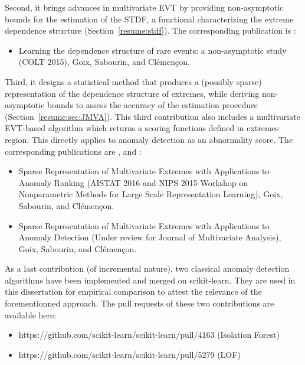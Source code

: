 
Second, it brings advances in multivariate EVT by providing non-asymptotic bounds for the estimation of the STDF, a functional characterizing the extreme dependence structure (Section~\ref{resume:stdf}). The corresponding publication is \cite{COLT15}:
\begin{itemize}
\item Learning the dependence structure of rare events: a non-asymptotic study (COLT 2015), Goix, Sabourin, and Clémençon.
\end{itemize}
Third, it designs a statistical method that produces a (possibly sparse) representation of the dependence structure of extremes, while deriving non-asymptotic bounds to assess the accuracy of the estimation procedure (Section~\ref{resume:sec:JMVA}).
%
This third contribution also includes a multivariate EVT-based algorithm which returns a scoring functions defined in extremes region. This directly applies to anomaly detection as an abnormality score.
The corresponding publications are \cite{AISTAT16}, \cite{NIPSWORKSHOP15} and \cite{ARXIV16}:
%
\begin{itemize}
\item Sparse Representation of Multivariate Extremes with Applications to Anomaly Ranking (AISTAT 2016 and NIPS 2015 Workshop on Nonparametric Methods for Large Scale Representation Learning), Goix, Sabourin, and Clémençon.
\item Sparse Representation of Multivariate Extremes with Applications to Anomaly Detection (Under review for Journal of Multivariate Analysis), Goix, Sabourin, and Clémençon.
\end{itemize}


As a last contribution (of incremental nature), two classical anomaly detection algorithms have been implemented and merged on scikit-learn. They are used in this dissertation for empirical comparison to attest the relevance of the forementionned approach.
The pull requests of these two contributions are available here:
\begin{itemize}
\item https://github.com/scikit-learn/scikit-learn/pull/4163  (Isolation Forest)
\item https://github.com/scikit-learn/scikit-learn/pull/5279 (LOF)
\end{itemize}


